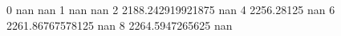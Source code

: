 0 nan nan
1 nan nan
2 2188.242919921875 nan
4 2256.28125 nan
6 2261.86767578125 nan
8 2264.5947265625 nan
